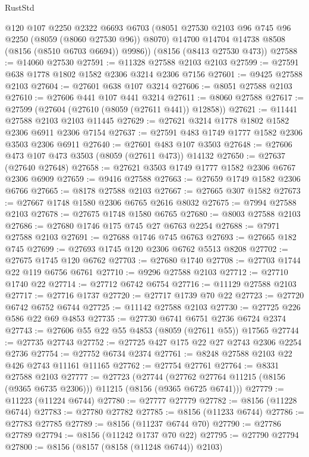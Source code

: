 \begin{lexlean}{RustStd}
\begin{coremodule}
{\begin{coremodule}
{{{{{{{{{{{{{{{{{{{{{{{{{{{{{{{{{{        @120
        @107
        @2250
        @2322
        @6693
        @6703
        (@8051 @27530 @2103 @96 @745 @96 @2250 (@8059 (@8060 @27530 @96)) @8070)
        @14700
        @14704
        @14738
        @8508
        (@8156 (@8510 @6703 @6694))
        @9986))
    (@8156 (@8413 @27530 @473))
@27588 := @14060 @27530
@27591 := @11328 @27588 @2103 @2103
@27599 := @27591 @638 @1778 @1802 @1582 @2306 @3214 @2306 @7156
@27601 := @9425 @27588 @2103
@27604 := @27601 @638 @107 @3214
@27606 := @8051 @27588 @2103
@27610 := @27606 @441 @107 @441 @3214
@27611 := @8060 @27588
@27617 := @27599 (@27604 (@27610 (@8059 (@27611 @441)) @12858))
@27621 := @11441 @27588 @2103 @2103 @11445
@27629 := @27621 @3214 @1778 @1802 @1582 @2306 @6911 @2306 @7154
@27637 := @27591 @483 @1749 @1777 @1582 @2306 @3503 @2306 @6911
@27640 := @27601 @483 @107 @3503
@27648 := @27606 @473 @107 @473 @3503 (@8059 (@27611 @473)) @14132
@27650 := @27637 (@27640 @27648)
@27658 := @27621 @3503 @1749 @1777 @1582 @2306 @6767 @2306 @6909
@27659 := @9416 @27588
@27663 := @27659 @1749 @1582 @2306 @6766
@27665 := @8178 @27588 @2103
@27667 := @27665 @307 @1582
@27673 := @27667 @1748 @1580 @2306 @6765 @2616 @8032
@27675 := @7994 @27588 @2103
@27678 := @27675 @1748 @1580 @6765
@27680 := @8003 @27588 @2103
@27686 := @27680 @1746 @175 @745 @27 @6763 @2254
@27688 := @7971 @27588 @2103
@27691 := @27688 @1746 @745 @6763
@27693 := @27665 @182 @745
@27699 := @27693 @1745 @120 @2306 @6762 @5513 @8208
@27702 := @27675 @1745 @120 @6762
@27703 := @27680 @1740
@27708 := @27703 @1744 @22 @119 @6756 @6761
@27710 := @9296 @27588 @2103
@27712 := @27710 @1740 @22
@27714 := @27712 @6742 @6754
@27716 := @11129 @27588 @2103
@27717 := @27716 @1737
@27720 := @27717 @1739 @70 @22
@27723 := @27720 @6742 @6752 @6744
@27725 := @11142 @27588 @2103
@27730 := @27725 @226 @586 @22 @69 @4853
@27735 := @27730 @6741 @6751 @2736 @6724 @2374
@27743 := @27606 @55 @22 @55 @4853 (@8059 (@27611 @55)) @17565
@27744 := @27735 @27743
@27752 := @27725 @427 @175 @22 @27 @2743 @2306 @2254 @2736
@27754 := @27752 @6734 @2374
@27761 := @8248 @27588 @2103 @22 @426 @2743 @11161 @11165
@27762 := @27754 @27761
@27764 := @8331 @27588 @2103
@27777 := @27723
    (@27744 (@27762 @27764 @11215 (@8156 (@9365 @6735 @2306))) @11215 (@8156 (@9365 @6725 @6741)))
@27779 := @11223 (@11224 @6744)
@27780 := @27777 @27779
@27782 := @8156 (@11228 @6744)
@27783 := @27780 @27782
@27785 := @8156 (@11233 @6744)
@27786 := @27783 @27785
@27789 := @8156 (@11237 @6744 @70)
@27790 := @27786 @27789
@27794 := @8156 (@11242 @1737 @70 @22)
@27795 := @27790 @27794
@27800 := @8156 (@8157 (@8158 (@11248 @6744)) @2103)
}}}}}}}}}}}}}}}}}}}}}}}}}}}}}}}}}}
\end{coremodule}}
\end{coremodule}
\end{lexlean}
